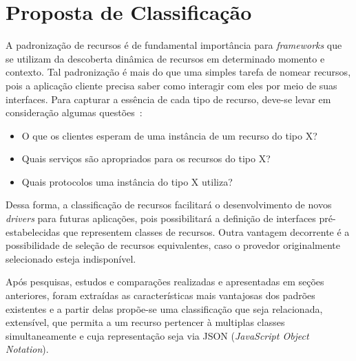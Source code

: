 \chapter{Proposta de Classificação}

A padronização de recursos é de fundamental importância para \emph{frameworks} que se utilizam da descoberta dinâmica de recursos em determinado momento e contexto. Tal padronização é mais do que uma simples tarefa de nomear recursos, pois a aplicação cliente precisa saber como interagir com eles por meio de suas interfaces. Para capturar a essência de cada tipo de recurso, deve-se levar em consideração algumas questões~\cite{pervasiveComputing}:

\begin{itemize}
	\item O que os clientes esperam de uma instância de um recurso do tipo X?

	\item Quais serviços são apropriados para os recursos do tipo X?

	\item Quais protocolos uma instância do tipo X utiliza?
\end{itemize}

Dessa forma, a classificação de recursos facilitará o desenvolvimento de novos \emph{drivers} para futuras aplicações, pois possibilitará a definição de interfaces pré-estabelecidas que representem classes de recursos. Outra vantagem decorrente é a possibilidade de seleção de recursos equivalentes, caso o provedor originalmente selecionado esteja indisponível.

Após pesquisas, estudos e comparações realizadas e apresentadas em seções anteriores, foram extraídas as características mais vantajosas dos padrões existentes e a partir delas propõe-se uma classificação que seja relacionada, extensível, que permita a um recurso pertencer à multiplas classes simultaneamente e cuja representação seja via JSON (\emph{JavaScript Object Notation}).

\begin{comment}
Neste capítulo falaremos sobre a classificação de dispositivos proposta. Essa classificação deverá ser relacionada, extensível e um dispositivo deverá poder fazer parte de múltiplas classes. A classificação relacionada facilita a implementação de novos \emph{drivers} para o \emph{uOS} que poderão se aproveitar das interfaces já existentes. Ser extensível, pois permite uma relação de especialização entre diferentes classes. A capacidade de permitir que um dispositivo pertença à diferentes classes, garante uma flexibilidade para dispositivos com diversos recursos poderem se encaixar nas classificações padrões sem a necessidade da definição de uma nova classe.
\end{comment}

